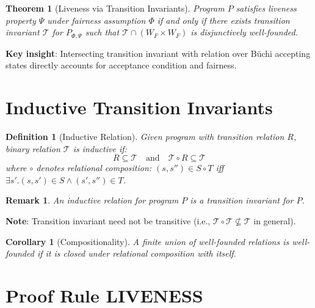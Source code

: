 \documentclass{article}
\newtheorem{definition}{Definition}
\newtheorem{theorem}{Theorem}
\newtheorem{corollary}{Corollary}
\newtheorem{remark}{Remark}
\begin{document}
\begin{theorem}[Liveness via Transition Invariants]
\label{thm:liveness}
Program $P$ satisfies liveness property $\Psi$ under fairness assumption $\Phi$ if and only if there exists transition invariant $\mathcal{T}$ for $P_{\Phi,\Psi}$ such that $\mathcal{T} \cap (W_F \times W_F)$ is disjunctively well-founded.
\end{theorem}

\textbf{Key insight}: Intersecting transition invariant with relation over Büchi accepting states directly accounts for acceptance condition and fairness.

\section{Inductive Transition Invariants}

\begin{definition}[Inductive Relation]
Given program with transition relation $R$, binary relation $\mathcal{T}$ is \emph{inductive} if:
\begin{equation}
R \subseteq \mathcal{T} \quad \text{and} \quad \mathcal{T} \circ R \subseteq \mathcal{T}
\end{equation}
where $\circ$ denotes relational composition: $(s, s'') \in S \circ T$ iff $\exists s'. (s, s') \in S \land (s', s'') \in T$.
\end{definition}

\begin{remark}
An inductive relation for program $P$ is a transition invariant for $P$.
\end{remark}

\textbf{Note}: Transition invariant need not be transitive (i.e., $\mathcal{T} \circ \mathcal{T} \not\subseteq \mathcal{T}$ in general).

\begin{corollary}[Compositionality]
A finite union of well-founded relations is well-founded if it is closed under relational composition with itself.
\end{corollary}

\section{Proof Rule LIVENESS}
\end{document}
